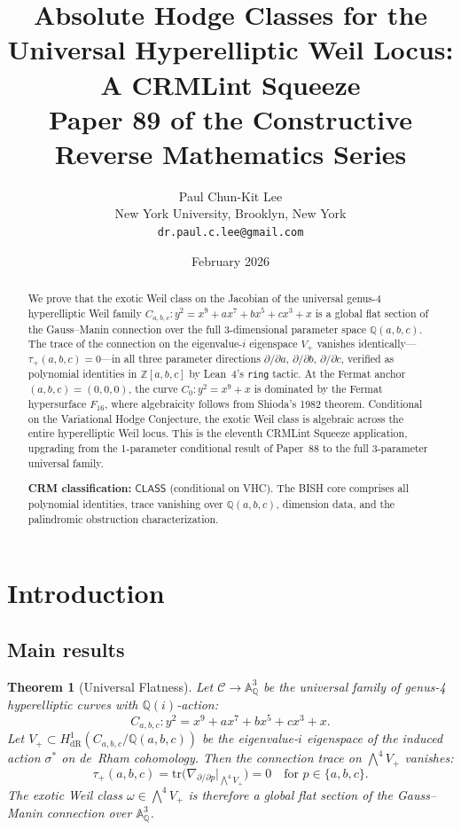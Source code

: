 \documentclass[11pt,a4paper]{article}
\title{Absolute Hodge Classes for the Universal Hyperelliptic Weil Locus:\\
A CRMLint Squeeze\\[6pt]
\large Paper 89 of the Constructive Reverse Mathematics Series}
\author{Paul Chun-Kit Lee\\
\small New York University, Brooklyn, New York\\
\small \texttt{dr.paul.c.lee@gmail.com}}
\date{February 2026}
\newtheorem{theorem}{Theorem}[section]
\theoremstyle{definition}
\theoremstyle{remark}
\newcommand{\ZZ}{\mathbb{Z}}
\newcommand{\QQ}{\mathbb{Q}}
\newcommand{\Aff}{\mathbb{A}}
\newcommand{\cC}{\mathcal{C}}
\newcommand{\tr}{\mathrm{tr}}
\newcommand{\CLASS}{\mathsf{CLASS}}
\begin{document}
\maketitle

\begin{abstract}
We prove that the exotic Weil class on the Jacobian of the universal genus-4
hyperelliptic Weil family $C_{a,b,c}: y^2 = x^9 + ax^7 + bx^5 + cx^3 + x$
is a global flat section of the Gauss--Manin connection over the full
3-dimensional parameter space $\QQ(a,b,c)$.
The trace of the connection on the eigenvalue-$i$ eigenspace $V_+$ vanishes
identically---$\tau_+(a,b,c) = 0$---in all three parameter directions
$\partial/\partial a$, $\partial/\partial b$, $\partial/\partial c$,
verified as polynomial identities in $\ZZ[a,b,c]$ by Lean~4's \texttt{ring} tactic.
At the Fermat anchor $(a,b,c) = (0,0,0)$, the curve $C_0: y^2 = x^9 + x$
is dominated by the Fermat hypersurface $F_{16}$, where algebraicity follows
from Shioda's 1982 theorem.
Conditional on the Variational Hodge Conjecture, the exotic Weil class is
algebraic across the entire hyperelliptic Weil locus.
This is the eleventh CRMLint Squeeze application, upgrading from the
1-parameter conditional result of Paper~88 to the full 3-parameter universal family.

\medskip
\noindent\textbf{CRM classification:} $\CLASS$ (conditional on VHC).
The BISH core comprises all polynomial identities, trace vanishing over $\QQ(a,b,c)$,
dimension data, and the palindromic obstruction characterization.
\end{abstract}

\tableofcontents

\section{Introduction}

\subsection{Main results}

\begin{theorem}[Universal Flatness]\label{thm:A}
Let $\cC \to \Aff^3_\QQ$ be the universal family of genus-4 hyperelliptic curves
with $\QQ(i)$-action:
\[
  C_{a,b,c}: y^2 = x^9 + ax^7 + bx^5 + cx^3 + x.
\]
Let $V_+ \subset H^1_{\mathrm{dR}}(C_{a,b,c}/\QQ(a,b,c))$ be the eigenvalue-$i$
eigenspace of the induced action $\sigma^*$ on de~Rham cohomology.
Then the connection trace on $\bigwedge^4 V_+$ vanishes:
\[
  \tau_+(a,b,c) = \tr\bigl(\nabla_{\partial/\partial p}\big|_{\bigwedge^4 V_+}\bigr) = 0
  \quad \text{for } p \in \{a, b, c\}.
\]
The exotic Weil class $\omega \in \bigwedge^4 V_+$ is therefore a global flat
section of the Gauss--Manin connection over $\Aff^3_\QQ$.
\end{theorem}
\end{document}
